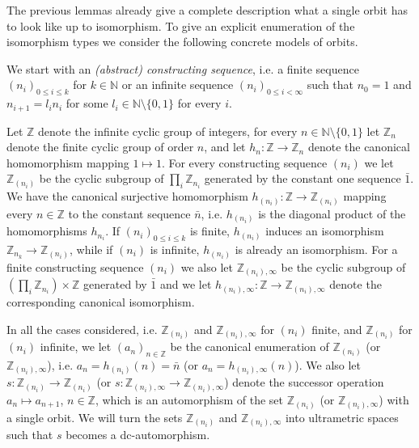 \documentclass[oneside,notitlepage,12pt]{article}
\theoremstyle{definition}
\theoremstyle{remark}
\newcommand \set [1]{\{#1\}}
\newcommand \maps {\colon} %
\newcommand \N {\mathbb{N}}
\newcommand \Z {\mathbb{Z}}
\begin{document}
The previous lemmas already give a complete description what a single orbit has to look like up to isomorphism.
To give an explicit enumeration of the isomorphism types we consider the following concrete models of orbits.

\medskip

We start with an \emph{(abstract) constructing sequence}, i.e. a finite sequence $(n_i)_{0 \leq i \leq k}$ for $k \in \N$ or an infinite sequence $(n_i)_{0 \leq i < \infty}$ such that $n_0 = 1$ and $n_{i + 1} = l_i n_i$ for some $l_i \in \N \setminus \set{0, 1}$ for every $i$.

Let $\Z$ denote the infinite cyclic group of integers, for every $n \in \N \setminus \set{0, 1}$ let $\Z_n$ denote the finite cyclic group of order $n$, and let $h_n\maps \Z \to \Z_n$ denote the canonical homomorphism mapping $1 \mapsto 1$.
For every constructing sequence $(n_i)$ we let $\Z_{(n_i)}$ be the cyclic subgroup of $\prod_i \Z_{n_i}$ generated by the constant one sequence $\bar{1}$.
We have the canonical surjective homomorphism $h_{(n_i)}\maps \Z \to \Z_{(n_i)}$ mapping every $n \in \Z$ to the constant sequence $\bar{n}$, i.e. $h_{(n_i)}$ is the diagonal product of the homomorphisms $h_{n_i}$.
If $(n_i)_{0 \leq i \leq k}$ is finite, $h_{(n_i)}$ induces an isomorphism $\Z_{n_k} \to \Z_{(n_i)}$, while if $(n_i)$ is infinite, $h_{(n_i)}$ is already an isomorphism.
For a finite constructing sequence $(n_i)$ we also let $\Z_{(n_i), \infty}$ be the cyclic subgroup of $(\prod_i \Z_{n_i}) \times \Z$ generated by $\bar{1}$ and we let $h_{(n_i), \infty}\maps \Z \to \Z_{(n_i), \infty}$ denote the corresponding canonical isomorphism.

In all the cases considered, i.e. $\Z_{(n_i)}$ and $\Z_{(n_i), \infty}$ for $(n_i)$ finite, and $\Z_{(n_i)}$ for $(n_i)$ infinite, we let $(a_n)_{n \in \Z}$ be the canonical enumeration of $\Z_{(n_i)}$ (or $\Z_{(n_i), \infty}$), i.e. $a_n = h_{(n_i)}(n) = \bar{n}$ (or $a_n = h_{(n_i),\infty}(n)$).
We also let $s\maps \Z_{(n_i)} \to \Z_{(n_i)}$ (or $s\maps\Z_{(n_i), \infty} \to \Z_{(n_i), \infty}$) denote the successor operation $a_n \mapsto a_{n + 1}$, $n \in \Z$, which is an automorphism of the set $\Z_{(n_i)}$ (or $\Z_{(n_i), \infty}$) with a single orbit.
We will turn the sets $\Z_{(n_i)}$ and $\Z_{(n_i), \infty}$ into ultrametric spaces such that $s$ becomes a dc-automorphism.
\end{document}
